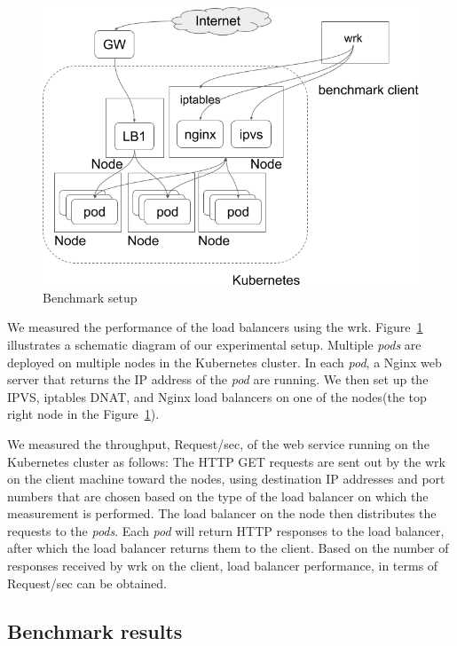 \begin{figure}
\includegraphics[width=\columnwidth]{Figs/benchmark-schem}
\caption{Benchmark setup}
\label{fig:benchmark-schem}
\end{figure}

We measured the performance of the load balancers using the wrk.
Figure~\ref{fig:benchmark-schem} illustrates a schematic diagram of our experimental setup.
Multiple {\em pods} are deployed on multiple nodes in the Kubernetes cluster. 
In each {\em pod}, a Nginx web server that returns the IP address of the {\em pod} are running.
We then set up the IPVS, iptables DNAT, and Nginx load balancers on one of the nodes(the top right node in the Figure~\ref{fig:benchmark-schem}). 

We measured the throughput, Request/sec, of the web service running on the Kubernetes cluster as follows:
The HTTP GET requests are sent out by the wrk on the client machine toward the nodes,
using destination IP addresses and port numbers that are chosen based on the type of the load balancer on which the measurement is performed.
The load balancer on the node then distributes the requests to the {\em pods}.
Each {\em pod} will return HTTP responses to the load balancer, after which the load balancer returns them to the client.
Based on the number of responses received by wrk on the client, 
load balancer performance, in terms of Request/sec can be obtained. 

\subsection{Benchmark results}

